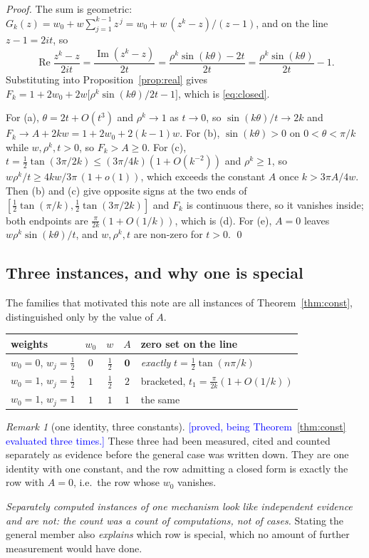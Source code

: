 \documentclass[11pt,a4paper]{article}
\theoremstyle{plain}
\theoremstyle{definition}
\theoremstyle{remark}
\newtheorem{remark}[theorem]{Remark}
\newcommand{\STATUS}[1]{\textcolor{blue}{\textsf{[#1]}}}
\begin{document}
\begin{proof}
The sum is geometric:
$G_k(z)=w_0+w\sum_{j=1}^{k-1}z^{\,j}=w_0+w\,(z^{k}-z)/(z-1)$, and on the line
$z-1=2it$, so
\[
  \operatorname{Re}\frac{z^{k}-z}{2it}
  =\frac{\operatorname{Im}(z^{k}-z)}{2t}
  =\frac{\rho^{k}\sin(k\theta)-2t}{2t}
  =\frac{\rho^{k}\sin(k\theta)}{2t}-1 .
\]
Substituting into Proposition~\ref{prop:real} gives
$F_k=1+2w_0+2w\bigl[\rho^{k}\sin(k\theta)/2t-1\bigr]$, which is \eqref{eq:closed}.

For (a), $\theta=2t+O(t^{3})$ and $\rho^{k}\to1$ as $t\to0$, so $\sin(k\theta)/t\to2k$
and $F_k\to A+2kw=1+2w_0+2(k-1)w$. For (b), $\sin(k\theta)>0$ on $0<\theta<\pi/k$ while
$w,\rho^{k},t>0$, so $F_k>A\ge0$. For (c), $t=\tfrac12\tan(3\pi/2k)\le(3\pi/4k)(1+O(k^{-2}))$
and $\rho^{k}\ge1$, so $w\rho^{k}/t\ge 4kw/3\pi\,(1+o(1))$, which exceeds the constant
$A$ once $k>3\pi A/4w$. Then (b) and (c) give opposite signs at the two ends of
$[\tfrac12\tan(\pi/k),\tfrac12\tan(3\pi/2k)]$ and $F_k$ is continuous there, so it
vanishes inside; both endpoints are $\tfrac{\pi}{2k}(1+O(1/k))$, which is (d). For (e),
$A=0$ leaves $w\rho^{k}\sin(k\theta)/t$, and $w,\rho^{k},t$ are non-zero for $t>0$. \qed
\end{proof}

\subsection{Three instances, and why one is special}\label{sec:instances}

The families that motivated this note are all instances of Theorem~\ref{thm:const},
distinguished only by the value of $A$.

\begin{center}
\begin{tabular}{lccc l}
\toprule
weights & $w_0$ & $w$ & $A$ & zero set on the line\\
\midrule
$w_0=0$, $w_j=\tfrac12$ & $0$ & $\tfrac12$ & $\mathbf{0}$
  & \emph{exactly} $t=\tfrac12\tan(n\pi/k)$\\
$w_0=1$, $w_j=\tfrac12$ & $1$ & $\tfrac12$ & $2$
  & bracketed, $t_1=\tfrac{\pi}{2k}(1+O(1/k))$\\
$w_0=1$, $w_j=1$ & $1$ & $1$ & $1$ & the same\\
\bottomrule
\end{tabular}
\end{center}

\begin{remark}[one identity, three constants]\label{rem:onethree}
\STATUS{proved, being Theorem~\ref{thm:const} evaluated three times.}
These three had been measured, cited and counted separately as evidence before the
general case was written down. They are one identity with one constant, and the row
admitting a closed form is exactly the row with $A=0$, i.e.\ the row whose $w_0$
vanishes.

\emph{Separately computed instances of one mechanism look like independent evidence and
are not: the count was a count of computations, not of cases.} Stating the general
member also \emph{explains} which row is special, which no amount of further measurement
would have done.
\end{remark}
\end{document}
